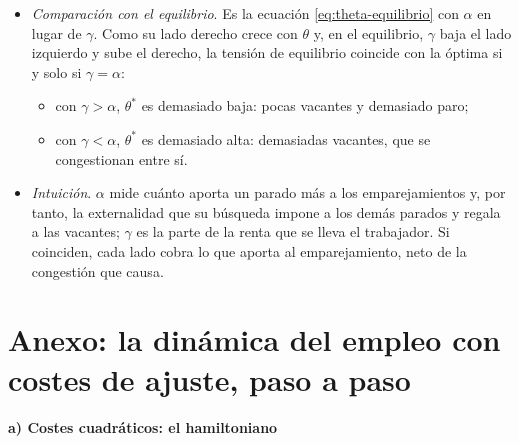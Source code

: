 \documentclass[11pt]{article}
\begin{document}
\begin{itemize}
\begin{equation*}
  \end{equation*}
\item \emph{Comparación con el equilibrio}. Es la ecuación \eqref{eq:theta-equilibrio} con $\alpha$ en lugar de $\gamma$. Como su lado derecho crece con $\theta$ y, en el equilibrio, $\gamma$ baja el lado izquierdo y sube el derecho, la tensión de equilibrio coincide con la óptima si y solo si $\gamma=\alpha$\nocite{Hosios1990Efficiency,Pissarides2000Equilibrium}:
  \begin{itemize}
  \item con $\gamma>\alpha$, $\theta^*$ es demasiado baja: pocas vacantes y demasiado paro;
  \item con $\gamma<\alpha$, $\theta^*$ es demasiado alta: demasiadas vacantes, que se congestionan entre sí.
  \end{itemize}
\item \emph{Intuición}. $\alpha$ mide cuánto aporta un parado más a los emparejamientos y, por tanto, la externalidad que su búsqueda impone a los demás parados y regala a las vacantes; $\gamma$ es la parte de la renta que se lleva el trabajador. Si coinciden, cada lado cobra lo que aporta al emparejamiento, neto de la congestión que causa. \findemo
\end{itemize}


\section{Anexo: la dinámica del empleo con costes de ajuste, paso a paso}\label{anexo:ajuste-derivacion}

\paragraph{a) Costes cuadráticos: el hamiltoniano}
\end{document}
